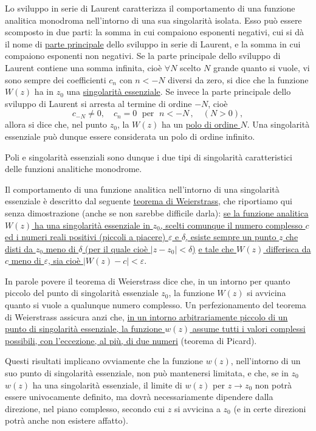 \documentclass[11pt, a4paper]{book}
\numberwithin{equation}{section}
\begin{document}
Lo sviluppo in serie di Laurent caratterizza il comportamento di una funzione analitica monodroma nell'intorno di una sua singolarità isolata. Esso può essere scomposto in due parti: la somma in cui compaiono esponenti negativi, cui si dà il nome di \uline{parte principale} dello sviluppo in serie di Laurent, e la somma in cui compaiono esponenti non negativi. Se la parte principale dello sviluppo di Laurent contiene una somma infinita, cioè $\forall N$ scelto $N$ grande quanto si vuole, vi sono sempre dei coefficienti $c_n$ con $n < -N$ diversi da zero, si dice che la funzione $W(z)$ ha in $z_0$ una \uline{singolarità essenziale}. Se invece la parte principale dello sviluppo di Laurent si arresta al termine di ordine $-N$, cioè
\begin{equation}
c_{-N} \neq 0, \quad c_n = 0 \;\text{ per }\; n < -N\,, \quad (N>0), \tag{5}
\end{equation}
allora si dice che, nel punto $z_0$, la $W(z)$ ha un \uline{polo di ordine $N$}. Una singolarità essenziale può dunque essere considerata un polo di ordine infinito.

Poli e singolarità essenziali sono dunque i due tipi di singolarità caratteristici delle funzioni analitiche monodrome.

Il comportamento di una funzione analitica nell'intorno di una singolarità essenziale è descritto dal seguente \uline{teorema di Weierstrass}, che riportiamo qui senza dimostrazione (anche se non sarebbe difficile darla): \uline{se la funzione analitica $W(z)$ ha una singolarità essenziale in $z_0$, scelti comunque il numero complesso $c$ ed i numeri reali positivi (piccoli a piacere) $\varepsilon$ e $\delta$, esiste sempre un punto $z$ che disti da $z_0$ meno di $\delta$ (per il quale cioè $|z - z_0| < \delta$)}%
\uline{e tale che $W(z)$ differisca da $c$ meno di $\varepsilon$, sia cioè $|W(z) - c| < \varepsilon$}.

In parole povere il teorema di Weierstrass dice che, in un intorno per quanto piccolo del punto di singolarità essenziale $z_0$, la funzione $W(z)$ si avvicina quanto si vuole a qualunque numero complesso. Un perfezionamento del teorema di Weierstrass assicura anzi che, \uline{in un intorno arbitrariamente piccolo di un punto di singolarità essenziale, la funzione $w(z)$ assume tutti i valori complessi possibili, con l'eccezione, al più, di due numeri} (teorema di Picard).

Questi risultati implicano ovviamente che la funzione $w(z)$, nell'intorno di un suo punto di singolarità essenziale, non può mantenersi limitata, e che, se in $z_0$ $w(z)$ ha una singolarità essenziale, il limite di $w(z)$ per $z \to z_0$ non potrà essere univocamente definito, ma dovrà necessariamente dipendere dalla direzione, nel piano complesso, secondo cui $z$ si avvicina a $z_0$ (e in certe direzioni potrà anche non esistere affatto).
\end{document}
